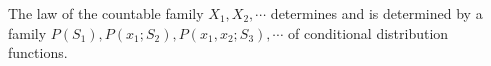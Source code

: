 The law of the countable family $X_1, X_2, \cdots$ determines and is determined by a family $P(S_1), P(x_1; S_2), P(x_1, x_2; S_3), \cdots$ of conditional distribution functions.
